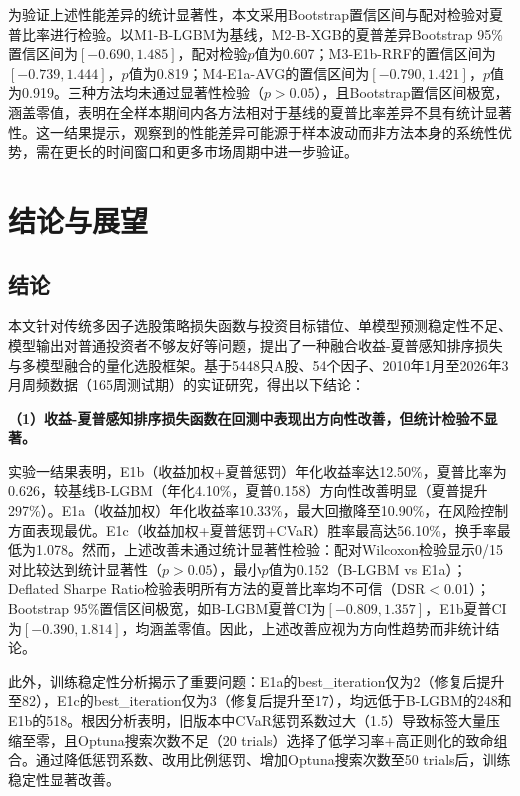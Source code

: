 \documentclass[11pt,a4paper]{ctexart}
\begin{document}
为验证上述性能差异的统计显著性，本文采用Bootstrap置信区间与配对检验对夏普比率进行检验。以M1-B-LGBM为基线，M2-B-XGB的夏普差异Bootstrap 95\%置信区间为$[-0.690, 1.485]$，配对检验$p$值为0.607；M3-E1b-RRF的置信区间为$[-0.739, 1.444]$，$p$值为0.819；M4-E1a-AVG的置信区间为$[-0.790, 1.421]$，$p$值为0.919。三种方法均未通过显著性检验（$p > 0.05$），且Bootstrap置信区间极宽，涵盖零值，表明在全样本期间内各方法相对于基线的夏普比率差异不具有统计显著性。这一结果提示，观察到的性能差异可能源于样本波动而非方法本身的系统性优势，需在更长的时间窗口和更多市场周期中进一步验证。

\section{结论与展望}

\subsection{结论}

本文针对传统多因子选股策略损失函数与投资目标错位、单模型预测稳定性不足、模型输出对普通投资者不够友好等问题，提出了一种融合收益-夏普感知排序损失与多模型融合的量化选股框架。基于5448只A股、54个因子、2010年1月至2026年3月周频数据（165周测试期）的实证研究，得出以下结论：

\textbf{（1）收益-夏普感知排序损失函数在回测中表现出方向性改善，但统计检验不显著。}

实验一结果表明，E1b（收益加权+夏普惩罚）年化收益率达12.50\%，夏普比率为0.626，较基线B-LGBM（年化4.10\%，夏普0.158）方向性改善明显（夏普提升297\%）。E1a（收益加权）年化收益率10.33\%，最大回撤降至10.90\%，在风险控制方面表现最优。E1c（收益加权+夏普惩罚+CVaR）胜率最高达56.10\%，换手率最低为1.078。然而，上述改善未通过统计显著性检验：配对Wilcoxon检验显示0/15对比较达到统计显著性（$p>0.05$），最小$p$值为0.152（B-LGBM vs E1a）；Deflated Sharpe Ratio检验表明所有方法的夏普比率均不可信（DSR$<$0.01）；Bootstrap 95\%置信区间极宽，如B-LGBM夏普CI为$[-0.809, 1.357]$，E1b夏普CI为$[-0.390, 1.814]$，均涵盖零值。因此，上述改善应视为方向性趋势而非统计结论。

此外，训练稳定性分析揭示了重要问题：E1a的best\_iteration仅为2（修复后提升至82），E1c的best\_iteration仅为3（修复后提升至17），均远低于B-LGBM的248和E1b的518。根因分析表明，旧版本中CVaR惩罚系数过大（1.5）导致标签大量压缩至零，且Optuna搜索次数不足（20 trials）选择了低学习率+高正则化的致命组合。通过降低惩罚系数、改用比例惩罚、增加Optuna搜索次数至50 trials后，训练稳定性显著改善。
\end{document}
